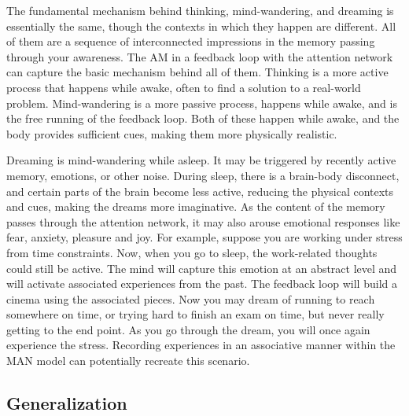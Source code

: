 \documentclass[reprint,amsmath,amssymb,apr,aip,onecolumn, 11pt]{revtex4-1}
\begin{document}
The fundamental mechanism behind thinking, mind-wandering, and dreaming is essentially the same, though the contexts in which they happen are different. All of them are a sequence of interconnected impressions in the memory passing through your awareness. The AM in a feedback loop with the attention network can capture the basic mechanism behind all of them.  Thinking is a more active process that happens while awake, often to find a solution to a real-world problem. Mind-wandering is a more passive process, happens while awake, and is the free running of the feedback loop. Both of these happen while awake, and the body provides sufficient cues, making them more physically realistic. 

Dreaming is mind-wandering while asleep. It may be triggered by recently active memory, emotions, or other noise. During sleep, there is a brain-body disconnect\cite{Jones_2018}, and certain parts of the brain become less active, reducing the physical contexts and cues, making the dreams more imaginative. As the content of the memory passes through the attention network, it may also arouse emotional responses like fear, anxiety, pleasure and joy. For example, suppose you are working under stress from time constraints. Now, when you go to sleep, the work-related thoughts could still be active. The mind will capture this emotion at an abstract level and will activate associated experiences from the past. The feedback loop will build a cinema using the associated pieces. Now you may dream of running to reach somewhere on time, or trying hard to finish an exam on time, but never really getting to the end point. As you go through the dream, you will once again experience the stress. Recording experiences in an associative manner within the MAN model can potentially recreate this scenario. 


\subsection{Generalization \label{sec:Generalization}}
\end{document}
